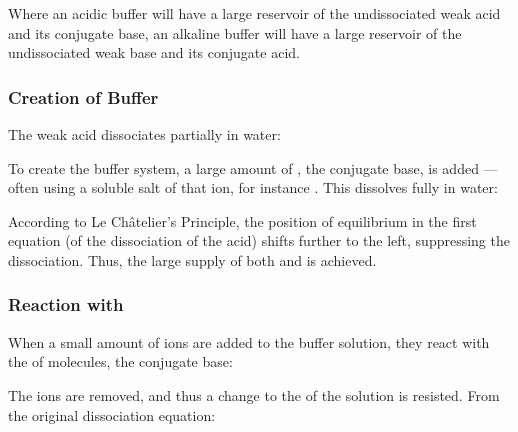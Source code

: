 			Where an acidic buffer will have a large reservoir of the undissociated weak acid and its conjugate base, an alkaline buffer will
			have a large reservoir of the undissociated weak base and its conjugate acid.

			\pagebreak
			\subsubsection{Creation of Buffer}

				The weak acid  dissociates partially in water:


				To create the buffer system, a large amount of , the conjugate base, is added --- often using a soluble salt of
				that ion, for instance . This dissolves fully in water:


				According to Le Châtelier's Principle, the position of equilibrium in the first equation (of the dissociation of the acid)
				shifts further to the left, suppressing the dissociation. Thus, the large supply of both  and  is
				achieved.



			\subsubsection{Reaction with \texorpdfstring{}{H⁺}}

				When a small amount of  ions are added to the buffer solution, they react with the  of
				 molecules, the conjugate base:


				The  ions are removed, and thus a change to the \pH{} of the solution is resisted. From the original dissociation
				equation:

